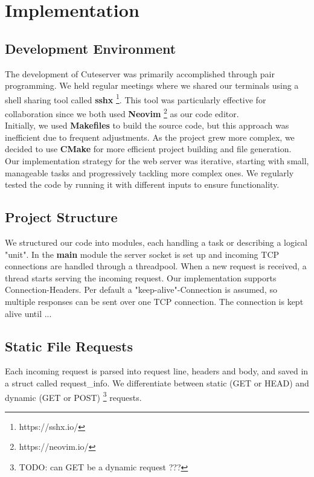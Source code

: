 \section*{Implementation}

\subsection*{Development Environment} 
The development of Cuteserver was primarily accomplished through pair programming. We held regular meetings where we shared our terminals using a shell sharing tool called \textbf{sshx} \footnote{https://sshx.io/}. This tool was particularly effective for collaboration since we both used \textbf{Neovim} \footnote{https://neovim.io/} as our code editor. \\
 
Initially, we used \textbf{Makefiles} to build the source code, but this approach was inefficient due to frequent adjustments. As the project grew more complex, we decided to use \textbf{CMake} for more efficient project building and file generation. \\

Our implementation strategy for the web server was iterative, starting with small, manageable tasks and progressively tackling more complex ones. We regularly tested the code by running it with different inputs to ensure functionality.

\subsection*{Project Structure} 
We structured our code into modules, each handling a task or describing a logical "unit". In the \textbf{main} module the server socket is set up and incoming TCP connections are handled through a threadpool. When a new request is received, a thread starts serving the incoming request. Our implementation supports Connection-Headers. Per default a "keep-alive"-Connection is assumed, so multiple responses can be sent over one TCP connection. The connection is kept alive until ... 

\subsection*{Static File Requests}
Each incoming request is parsed into request line, headers and body, and saved in a struct called request\_info. We differentiate between static (GET or HEAD) and dynamic (GET or POST) \footnote{TODO: can GET be a dynamic request ???} requests. \\

